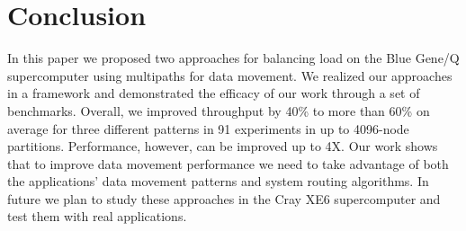 \section{Conclusion}
\label{sec:conclusion}

In this paper we proposed two approaches for balancing load on the Blue Gene/Q supercomputer using multipaths for data movement. We realized our approaches in a framework and demonstrated the efficacy of our work through a set of benchmarks. Overall, we improved throughput by 40\% to more than 60\% on average for three different patterns in 91 experiments in up to 4096-node partitions. Performance, however, can be improved up to 4X. Our work shows that to improve data movement performance we need to take advantage of both the applications' data movement patterns and system routing algorithms. In future we plan to study these approaches in the Cray XE6 supercomputer and test them with real applications.
